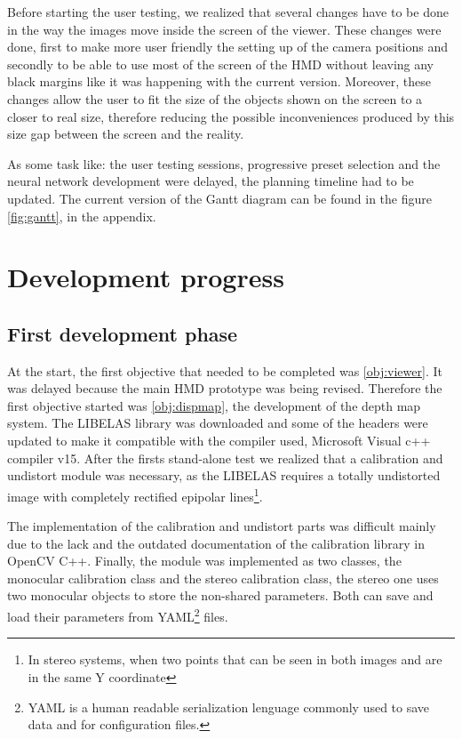 \documentclass[10pt,a4paper,twocolumn,twoside]{article}
\begin{document}
		Before starting the user testing, we realized that several changes have to be done in the way the images move inside the screen of the viewer. These changes were done, first to make more user friendly the setting up of the camera positions and secondly to be able to use most of the screen of the HMD without leaving any black margins like it was happening with the current version. Moreover, these changes allow the user to fit the size of the objects shown on the screen to a closer to real size, therefore reducing the possible inconveniences produced by this size gap between the screen and the reality.  

	As some task like: the user testing sessions, progressive preset selection and the neural network development were delayed, the planning timeline had to be updated. The current version of the Gantt diagram can be found in the figure \ref{fig:gantt}, in the appendix.
	
	
	\section{Development progress}
	 
	\subsection{First development phase}
	
	At the start, the first objective that needed to be completed was \ref{obj:viewer}. It was delayed because the main HMD prototype was being revised. Therefore the first objective started was \ref{obj:dispmap}, the development of the depth map system. The LIBELAS library was downloaded and some of the headers were updated to make it compatible with the compiler used, Microsoft Visual c++ compiler v15. After the firsts stand-alone test we realized that a calibration and undistort module was necessary, as the LIBELAS requires a totally undistorted image with completely rectified epipolar lines\footnote{In stereo systems, when two points that can be seen in both images and are in the same Y coordinate}. 
	
	The implementation of the calibration and undistort parts was difficult mainly due to the lack and the outdated documentation of the calibration library in OpenCV C++. Finally, the module was implemented as two classes, the monocular calibration class and the stereo calibration class, the stereo one uses two monocular objects to store the non-shared parameters. Both can save and load their parameters from YAML\footnote{YAML is a human readable serialization lenguage commonly used to save data and for configuration files.} files.
	
\end{document}
